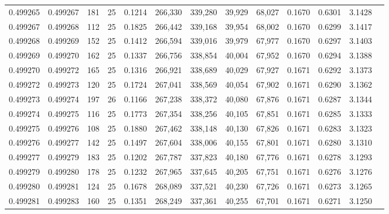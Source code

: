 \begin{tabular}{rrrrrrrrrrrrr}
0.499265 & 0.499267 & 181 &  25 &                                     0.1214 & 266,330 & 339,280 &  39,929 &  68,027 & 0.1670 & 0.6301 & 3.1428 \\
0.499267 & 0.499268 & 112 &  25 &                                     0.1825 & 266,442 & 339,168 &  39,954 &  68,002 & 0.1670 & 0.6299 & 3.1417 \\
0.499268 & 0.499269 & 152 &  25 &                                     0.1412 & 266,594 & 339,016 &  39,979 &  67,977 & 0.1670 & 0.6297 & 3.1403 \\
0.499269 & 0.499270 & 162 &  25 &                                     0.1337 & 266,756 & 338,854 &  40,004 &  67,952 & 0.1670 & 0.6294 & 3.1388 \\
0.499270 & 0.499272 & 165 &  25 &                                     0.1316 & 266,921 & 338,689 &  40,029 &  67,927 & 0.1671 & 0.6292 & 3.1373 \\
0.499272 & 0.499273 & 120 &  25 &                                     0.1724 & 267,041 & 338,569 &  40,054 &  67,902 & 0.1671 & 0.6290 & 3.1362 \\
0.499273 & 0.499274 & 197 &  26 &                                     0.1166 & 267,238 & 338,372 &  40,080 &  67,876 & 0.1671 & 0.6287 & 3.1344 \\
0.499274 & 0.499275 & 116 &  25 &                                     0.1773 & 267,354 & 338,256 &  40,105 &  67,851 & 0.1671 & 0.6285 & 3.1333 \\
0.499275 & 0.499276 & 108 &  25 &                                     0.1880 & 267,462 & 338,148 &  40,130 &  67,826 & 0.1671 & 0.6283 & 3.1323 \\
0.499276 & 0.499277 & 142 &  25 &                                     0.1497 & 267,604 & 338,006 &  40,155 &  67,801 & 0.1671 & 0.6280 & 3.1310 \\
0.499277 & 0.499279 & 183 &  25 &                                     0.1202 & 267,787 & 337,823 &  40,180 &  67,776 & 0.1671 & 0.6278 & 3.1293 \\
0.499279 & 0.499280 & 178 &  25 &                                     0.1232 & 267,965 & 337,645 &  40,205 &  67,751 & 0.1671 & 0.6276 & 3.1276 \\
0.499280 & 0.499281 & 124 &  25 &                                     0.1678 & 268,089 & 337,521 &  40,230 &  67,726 & 0.1671 & 0.6273 & 3.1265 \\
0.499281 & 0.499283 & 160 &  25 &                                     0.1351 & 268,249 & 337,361 &  40,255 &  67,701 & 0.1671 & 0.6271 & 3.1250 \\

\end{tabular}
